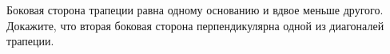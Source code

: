 \begin{ex}
	\begin{condition}
		Боковая сторона трапеции равна одному основанию	и вдвое меньше другого. Докажите, что вторая боковая сторона перпендикулярна одной из диагоналей трапеции.
	\end{condition}
\end{ex}